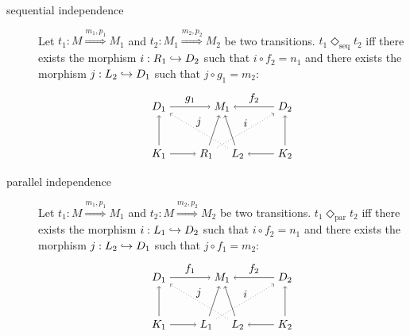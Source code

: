 \begin{definition}
  \label{def:indep}
  $~$
  \begin{description}
  \item[sequential independence]
    Let $t_1:M\overset{m_1,p_1}{\Rightarrow} M_1$ and $t_2:M_1\overset{m_2,p_2}{\Rightarrow} M_2$ be two transitions.
    $t_1 \Diamond_{\text{seq}} t_2$ iff there exists the morphism $i:R_1\hookrightarrow D_2$ such that $i\circ f_2 = n_1$ and there exists the morphism $j:L_2\hookrightarrow D_1$ such that $j\circ g_1= m_2$:
    \[
    \begin{tikzpicture} %
    \node (r1) at (1.5,0) {\(R_1\)};
    \node (m1) at (2,1.5) {\(M_1\)};
    \node (l2) at (2.5,0) {\(L_2\)};
    \node (d1) at (0,1.5) {\(D_1\)};
    \node (k1) at (0,0) {\(K_1\)};
    \node (d2) at (4,1.5) {\(D_2\)};
    \node (k2) at (4,0) {\(K_2\)};
    \draw [->] (k1) -- (r1);
    \draw [->] (k2) -- (l2);
    \draw [->] (k1) -- (d1);
    \draw [->] (k2) -- (d2);
    \draw [->] (d1) -- node [above,midway] {\(g_1\)} (m1);
    \draw [->] (d2) -- node [above,midway] {\(f_2\)} (m1);
    \draw [->] (l2) -- (m1);
    \draw [->] (r1) -- (m1);
    \draw [dotted,->] (r1) -- node [above,midway] {\(i\)} (d2);
    \draw [dotted,->] (l2) -- node [above,midway] {\(j\)} (d1);
    \end{tikzpicture}
    \]
  \item[parallel independence]
    Let $t_1:M\overset{m_1,p_1}{\Rightarrow} M_1$ and $t_2:M\overset{m_2,p_2}{\Rightarrow} M_2$ be two transitions.
    $t_1 \Diamond_{\text{par}} t_2$ iff there exists the morphism $i:L_1\hookrightarrow D_2$ such that $i\circ f_2= n_1$ and there exists the morphism $j:L_2\hookrightarrow D_1$ such that $j\circ f_1= m_2$:
    \[
    \begin{tikzpicture} %
    \node (r1) at (1.5,0) {\(L_1\)};
    \node (m1) at (2,1.5) {\(M_1\)};
    \node (l2) at (2.5,0) {\(L_2\)};
    \node (d1) at (0,1.5) {\(D_1\)};
    \node (k1) at (0,0) {\(K_1\)};
    \node (d2) at (4,1.5) {\(D_2\)};
    \node (k2) at (4,0) {\(K_2\)};
    \draw [->] (k1) -- (r1);
    \draw [->] (k2) -- (l2);
    \draw [->] (k1) -- (d1);
    \draw [->] (k2) -- (d2);
    \draw [->] (d1) -- node [above,midway] {\(f_1\)} (m1);
    \draw [->] (d2) -- node [above,midway] {\(f_2\)} (m1);
    \draw [->] (l2) -- (m1);
    \draw [->] (r1) -- (m1);
    \draw [dotted,->] (r1) -- node [above,midway] {\(i\)} (d2);
    \draw [dotted,->] (l2) -- node [above,midway] {\(j\)} (d1);
    \end{tikzpicture}
    \]
  \end{description}
\end{definition}

